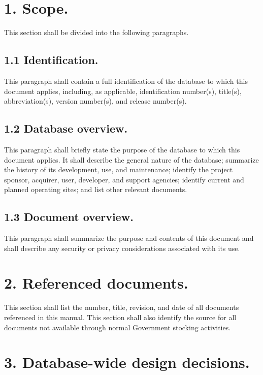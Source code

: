 \section{1. Scope.}

This section shall be divided into the following paragraphs.

\subsection{1.1 Identification.}

This paragraph shall contain a full identification of the database to
which this document applies, including, as applicable, identification
number(s), title(s), abbreviation(s), version number(s), and release
number(s).

\subsection{1.2 Database overview.}

This paragraph shall briefly state the purpose of the database to which
this document applies. It shall describe the general nature of the
database; summarize the history of its development, use, and
maintenance; identify the project sponsor, acquirer, user, developer,
and support agencies; identify current and planned operating sites; and
list other relevant documents.

\subsection{1.3 Document overview.}

This paragraph shall summarize the purpose and contents of this document
and shall describe any security or privacy considerations associated
with its use.

\section{2. Referenced documents.}

This section shall list the number, title, revision, and date of all
documents referenced in this manual. This section shall also identify
the source for all documents not available through normal Government
stocking activities.

\section{3. Database-wide design decisions.}

